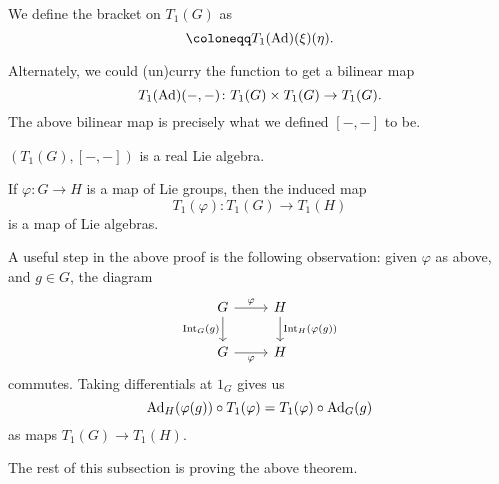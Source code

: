 \documentclass[12pt]{article}
\begin{document}
We define the bracket on $T_{1}(G)$ as
\begin{equation*} 
	[\xi, \eta] \coloneqq T_{1}(\Ad)(\xi)(\eta).
\end{equation*}

Alternately, we could (un)curry the function  to get a bilinear map
\begin{equation*} 
	T_{1}(\operatorname{Ad})(-, -) \colon T_{1}(G) \times T_{1}(G) \to T_{1}(G).
\end{equation*}
The above bilinear map is precisely what we defined $[-, -]$ to be.

\begin{thm} \label{thm:lie-algebra-functor}
	$(T_{1}(G), [-, -])$ is a real Lie algebra.

	If $\varphi \colon G \to H$ is a map of Lie groups, then the induced map
	\begin{equation*} 
		T_{1}(\varphi) \colon T_{1}(G) \to T_{1}(H)
	\end{equation*}
	is a map of Lie algebras.
\end{thm}

A useful step in the above proof is the following observation: 
given $\varphi$ as above, and $g \in G$, the diagram
\begin{equation*} 
	\begin{tikzcd}
		G \arrow[r, "\varphi"] \arrow[d, "\INT_{G}(g)"'] & H \arrow[d, "\INT_{H}(\varphi(g))"] \\
		G \arrow[r, "\varphi"'] & H
	\end{tikzcd}
\end{equation*}
commutes. Taking differentials at $1_{G}$ gives us
\begin{equation*} 
	\operatorname{Ad}_{H}(\varphi(g)) \circ T_{1}(\varphi) = T_{1}(\varphi) \circ \operatorname{Ad}_{G}(g)
\end{equation*}
as maps $T_{1}(G) \to T_{1}(H)$.

The rest of this subsection is proving the above theorem.
\end{document}
